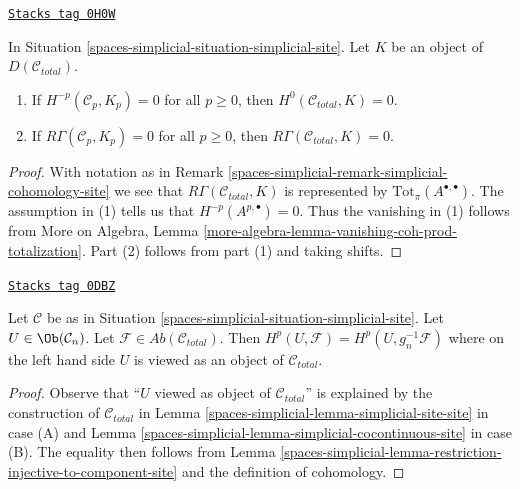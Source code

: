 \begin{lemma}
\label{spaces-simplicial-lemma-simplicial-sheaf-cohomology-site-zero}
\href{https://stacks.math.columbia.edu/tag/0H0W}{\texttt{Stacks tag 0H0W}}

In Situation \ref{spaces-simplicial-situation-simplicial-site}. Let $K$ be an object of
$D(\mathcal{C}_{total})$.
\begin{enumerate}
\item If $H^{-p}(\mathcal{C}_p, K_p) = 0$ for all $p \geq 0$, then
$H^0(\mathcal{C}_{total}, K) = 0$.
\item If $R\Gamma(\mathcal{C}_p, K_p) = 0$
for all $p \geq 0$, then $R\Gamma(\mathcal{C}_{total}, K) = 0$.
\end{enumerate}
\end{lemma}

\begin{proof}
With notation as in Remark \ref{spaces-simplicial-remark-simplicial-cohomology-site}
we see that $R\Gamma(\mathcal{C}_{total}, K)$ is
represented by $\text{Tot}_\pi(A^{\bullet, \bullet})$.
The assumption in (1) tells us that $H^{-p}(A^{p, \bullet}) = 0$.
Thus the vanishing in (1) follows from
More on Algebra, Lemma \ref{more-algebra-lemma-vanishing-coh-prod-totalization}.
Part (2) follows from part (1) and taking shifts.
\end{proof}

\begin{lemma}
\label{spaces-simplicial-lemma-sanity-check}
\href{https://stacks.math.columbia.edu/tag/0DBZ}{\texttt{Stacks tag 0DBZ}}

Let $\mathcal{C}$ be as in Situation \ref{spaces-simplicial-situation-simplicial-site}.
Let $U \in \Ob(\mathcal{C}_n)$. Let
$\mathcal{F} \in \textit{Ab}(\mathcal{C}_{total})$.
Then $H^p(U, \mathcal{F}) = H^p(U, g_n^{-1}\mathcal{F})$
where on the left hand side $U$ is viewed as an object of $\mathcal{C}_{total}$.
\end{lemma}

\begin{proof}
Observe that ``$U$ viewed as object of $\mathcal{C}_{total}$''
is explained by the construction of $\mathcal{C}_{total}$ in
Lemma \ref{spaces-simplicial-lemma-simplicial-site-site} in case (A) and
Lemma \ref{spaces-simplicial-lemma-simplicial-cocontinuous-site} in case (B).
The equality then follows from
Lemma \ref{spaces-simplicial-lemma-restriction-injective-to-component-site}
and the definition of cohomology.
\end{proof}

